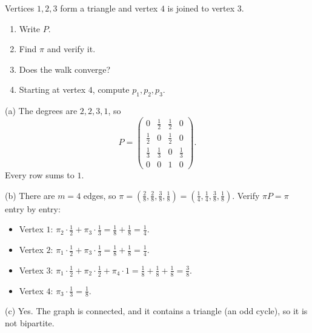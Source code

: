 \begin{exercisebox}
\begin{pproblem}\label{pp:triangle}
    Vertices $1, 2, 3$ form a triangle and vertex $4$ is joined to vertex $3$.
    \begin{enumerate}[label=(\alph*)]
        \item Write $P$.
        \item Find $\pi$ and verify it.
        \item Does the walk converge?
        \item Starting at vertex $4$, compute $p_1, p_2, p_3$.
    \end{enumerate}
\end{pproblem}
\tcblower
\begin{wsolution}
    (a) The degrees are $2, 2, 3, 1$, so
    \[P = \begin{pmatrix}
            0            & \tfrac{1}{2} & \tfrac{1}{2} & 0            \\
            \tfrac{1}{2} & 0            & \tfrac{1}{2} & 0            \\
            \tfrac{1}{3} & \tfrac{1}{3} & 0            & \tfrac{1}{3} \\
            0            & 0            & 1            & 0
        \end{pmatrix}.\]
    Every row sums to $1$.

    (b) There are $m = 4$ edges, so
    $\pi = \left(\frac{2}{8}, \frac{2}{8}, \frac{3}{8}, \frac{1}{8}\right)
        = \left(\frac{1}{4}, \frac{1}{4}, \frac{3}{8}, \frac{1}{8}\right)$.
    Verify $\pi P = \pi$ entry by entry:
    \begin{itemize}
        \item Vertex $1$: $\pi_2 \cdot \frac{1}{2} + \pi_3 \cdot \frac{1}{3} = \frac{1}{8} + \frac{1}{8} = \frac{1}{4}$.
        \item Vertex $2$: $\pi_1 \cdot \frac{1}{2} + \pi_3 \cdot \frac{1}{3} = \frac{1}{8} + \frac{1}{8} = \frac{1}{4}$.
        \item Vertex $3$: $\pi_1 \cdot \frac{1}{2} + \pi_2 \cdot \frac{1}{2} + \pi_4 \cdot 1
                  = \frac{1}{8} + \frac{1}{8} + \frac{1}{8} = \frac{3}{8}$.
        \item Vertex $4$: $\pi_3 \cdot \frac{1}{3} = \frac{1}{8}$.
    \end{itemize}

    (c) Yes. The graph is connected, and it contains a triangle (an odd cycle), so it is not
    bipartite.


\end{wsolution}
\end{exercisebox}

